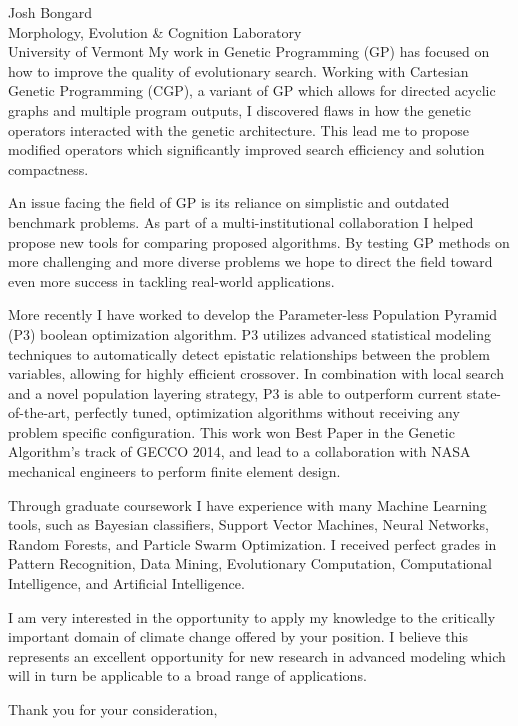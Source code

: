 \documentclass[11pt]{letter} %
\begin{document}
\begin{letter}{
Josh Bongard \\
Morphology, Evolution \& Cognition Laboratory \\
University of Vermont}
My work in Genetic Programming (GP) has focused on how to improve the quality of evolutionary search.
Working with Cartesian Genetic Programming (CGP), a variant of GP which allows for
directed acyclic graphs and multiple program outputs, I discovered flaws in how the genetic operators interacted
with the genetic architecture. This lead me to propose modified operators which significantly improved search
efficiency and solution compactness.

An issue facing the field of GP is its reliance on simplistic and outdated benchmark problems. As part of a multi-institutional
collaboration I helped propose new tools for comparing proposed algorithms. By testing GP methods on more challenging
and more diverse problems we hope to direct the field toward even more success in tackling real-world applications.

More recently I have worked to develop the Parameter-less Population Pyramid (P3) boolean optimization algorithm. P3
utilizes advanced statistical modeling techniques to automatically detect epistatic relationships between the problem variables,
allowing for highly efficient crossover. In combination with local search and a novel population layering strategy, P3 is able
to outperform current state-of-the-art, perfectly tuned, optimization algorithms without receiving any problem specific configuration.
This work won Best Paper in the Genetic Algorithm's track of GECCO 2014, and lead to a collaboration with NASA mechanical engineers
to perform finite element design.

Through graduate coursework I have experience with many Machine Learning tools, such as Bayesian classifiers,
Support Vector Machines, Neural Networks, Random Forests, and Particle Swarm Optimization.
I received perfect grades in Pattern Recognition, Data Mining, Evolutionary Computation, Computational Intelligence,
and Artificial Intelligence.

I am very interested in the opportunity to apply my knowledge to the critically important domain of climate change offered by your
position. I believe this represents an excellent opportunity for new research
in advanced modeling which will in turn be applicable to a broad range of applications.

\closing{Thank you for your consideration,}




\end{letter}
\end{document}
